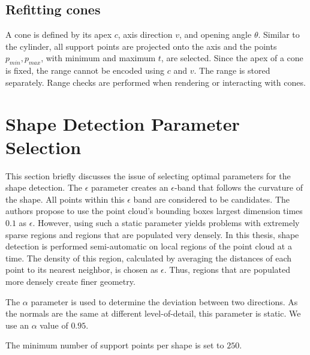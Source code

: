 \subsection{Refitting cones}

A cone is defined by its apex $c$, axis direction $v$, and opening angle $\theta$. Similar to the cylinder, all support points are projected onto the axis and the points $p_{min}, p_{max}$, with minimum and maximum $t$, are selected. Since the apex of a cone is fixed, the range cannot be encoded using $c$ and $v$. The range is stored separately. Range checks are performed when rendering or interacting with cones. 


\section{Shape Detection Parameter Selection}
\label{sec:shapeDetectionParameterSelection}

This section briefly discusses the issue of selecting optimal parameters for the shape detection. The $\epsilon$ parameter creates an $\epsilon$-band that follows the curvature of the shape. All points within this $\epsilon$ band are considered to be candidates. The authors propose to use the point cloud's bounding boxes largest dimension times $0.1$ as $\epsilon$. However, using such a static parameter yields problems with extremely sparse regions and regions that are populated very densely. In this thesis, shape detection is performed semi-automatic on local regions of the point cloud at a time. The density of this region, calculated by averaging the distances of each point to its nearest neighbor, is chosen as $\epsilon$. Thus, regions that are populated more densely create finer geometry. 

The $\alpha$ parameter is used to determine the deviation between two directions. As the normals are the same at different level-of-detail, this parameter is static. We use an $\alpha$ value of $0.95$. 

The minimum number of support points per shape is set to $250$.